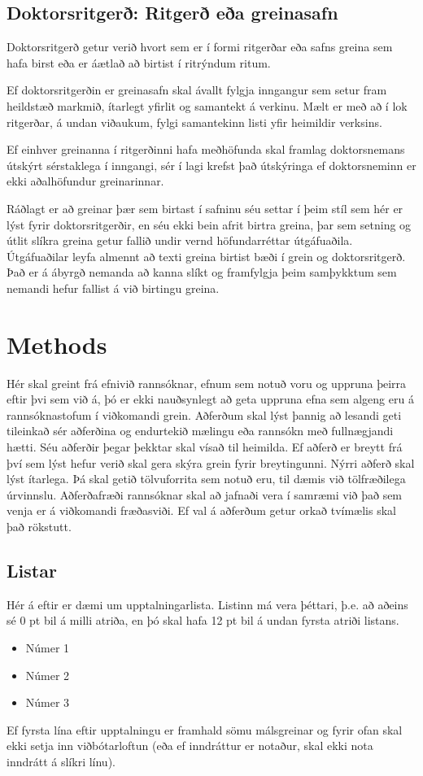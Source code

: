 \documentclass[a4paper,12pt,twoside,BCOR=10mm]{scrbook}
\begin{document}
\section{Doktorsritgerð: Ritgerð eða greinasafn}
Doktorsritgerð getur verið hvort sem er í formi ritgerðar eða safns greina sem hafa birst eða  er áætlað að birtist í ritrýndum ritum. 

Ef doktorsritgerðin er greinasafn skal ávallt fylgja inngangur sem setur fram heildstæð markmið, ítarlegt yfirlit og samantekt á verkinu. Mælt er með að í lok ritgerðar, á undan viðaukum, fylgi samantekinn listi yfir heimildir verksins.

Ef einhver greinanna í ritgerðinni hafa meðhöfunda skal framlag doktorsnemans útskýrt sérstaklega í inngangi, sér í lagi krefst það útskýringa ef doktorsneminn er ekki aðalhöfundur greinarinnar. 

Ráðlagt er að greinar þær sem birtast í safninu séu settar í þeim stíl sem hér er lýst fyrir doktorsritgerðir, en séu ekki bein afrit birtra greina, þar sem setning og útlit slíkra greina getur fallið undir vernd höfundarréttar útgáfuaðila. Útgáfuaðilar leyfa almennt að texti greina birtist bæði í grein og doktorsritgerð. Það er á ábyrgð nemanda að kanna slíkt og framfylgja þeim samþykktum sem nemandi hefur fallist á við birtingu greina.
 
\chapter{Methods}
Hér skal greint frá efnivið rannsóknar, efnum sem notuð voru og uppruna þeirra eftir þvi sem við á, þó er ekki nauðsynlegt að geta uppruna efna sem algeng eru á rannsóknastofum í viðkomandi grein. Aðferðum skal lýst þannig að lesandi geti tileinkað sér aðferðina og endurtekið mælingu eða rannsókn með fullnægjandi hætti. Séu aðferðir þegar þekktar skal vísað til heimilda. Ef aðferð er breytt frá því sem lýst hefur verið skal gera skýra grein fyrir breytingunni. Nýrri aðferð skal lýst ítarlega. Þá skal getið tölvuforrita sem notuð eru, til dæmis við tölfræðilega úrvinnslu. Aðferðafræði rannsóknar skal að jafnaði vera í samræmi við það sem venja er á viðkomandi fræðasviði. Ef val á aðferðum getur orkað tvímælis skal það rökstutt.

\section{Listar}
Hér á eftir er dæmi um upptalningarlista. Listinn má vera þéttari, þ.e. að aðeins sé 0 pt bil á milli atriða, en þó skal hafa 12 pt bil á undan fyrsta atriði listans.
\begin{itemize}
 \item Númer 1
 \item Númer 2
 \item Númer 3
\end{itemize}
Ef fyrsta lína eftir upptalningu er framhald sömu málsgreinar og fyrir ofan skal ekki setja inn viðbótarloftun (eða ef inndráttur er notaður, skal ekki nota inndrátt á slíkri línu). 
\end{document}
